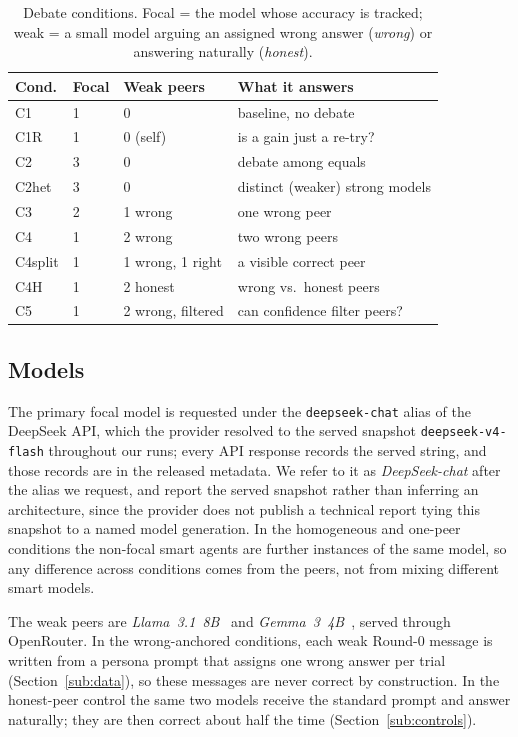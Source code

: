 \documentclass[11pt]{article}
\begin{document}
\begin{table}[t]
\centering
\small
\caption{Debate conditions. Focal = the model whose accuracy is tracked;
weak = a small model arguing an assigned wrong answer (\emph{wrong}) or
answering naturally (\emph{honest}).\label{tab:setup}}
\begin{tabular}{@{}llll@{}}
\toprule
Cond. & Focal & Weak peers & What it answers \\
\midrule
C1  & 1 & 0            & baseline, no debate \\
C1R & 1 & 0 (self)     & is a gain just a re-try? \\
C2  & 3 & 0            & debate among equals \\
C2het & 3 & 0          & distinct (weaker) strong models \\
C3  & 2 & 1 wrong      & one wrong peer \\
C4  & 1 & 2 wrong      & two wrong peers \\
C4split & 1 & 1 wrong, 1 right & a visible correct peer \\
C4H & 1 & 2 honest     & wrong vs.\ honest peers \\
C5  & 1 & 2 wrong, filtered & can confidence filter peers? \\
\bottomrule
\end{tabular}
\end{table}

\subsection{Models}
\label{sub:models}

The primary focal model is requested under the \texttt{deepseek-chat} alias
of the DeepSeek API, which the provider resolved to the served snapshot
\texttt{deepseek-v4-flash} throughout our runs; every API response records
the served string, and those records are in the released metadata.
We refer to it as \textit{DeepSeek-chat} after the alias we request, and
report the served snapshot rather than inferring an architecture, since the
provider does not publish a technical report tying this snapshot to a named
model generation.
In the homogeneous and one-peer conditions the non-focal smart agents are
further instances of the same model, so any difference across conditions
comes from the peers, not from mixing different smart models.

The weak peers are \textit{Llama~3.1~8B}~\citep{meta2024llama3} and
\textit{Gemma~3~4B}~\citep{gemma2025technical}, served through OpenRouter.
In the wrong-anchored conditions, each weak Round-0 message is written from
a persona prompt that assigns one wrong answer per trial
(Section~\ref{sub:data}), so these messages are never correct by
construction.
In the honest-peer control the same two models receive the standard prompt
and answer naturally; they are then correct about half the time
(Section~\ref{sub:controls}).
\end{document}

